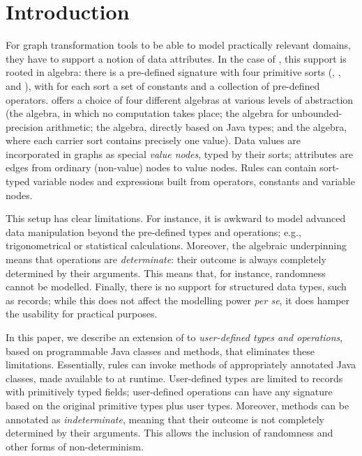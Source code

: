 \section{Introduction}
\label{sec:intro}

For graph transformation tools to be able to model practically relevant domains, they have to support a notion of data attributes. In the case of \GROOVE, this support is rooted in algebra: there is a pre-defined signature with four primitive sorts (\intS, \realS, \boolS and \stringS), with for each sort a set of constants and a collection of pre-defined operators. \GROOVE offers a choice of four different algebras at various levels of abstraction (the \termA algebra, in which no computation takes place; the \bigA algebra for unbounded-precision arithmetic; the \javaA algebra, directly based on Java types; and the \pointA algebra, where each carrier sort contains precisely one value).
%
Data values are incorporated in graphs as special \emph{value nodes}, typed by their sorts; attributes are edges from ordinary (non-value) nodes to value nodes. Rules can contain sort-typed variable nodes and expressions built from operators, constants and variable nodes.

This setup has clear limitations. For instance, it is awkward to model advanced data manipulation beyond the pre-defined types and operations; e.g., trigonometrical or statistical calculations. Moreover, the algebraic underpinning means that operations are \emph{determinate}: their outcome is always completely determined by their arguments. This means that, for instance, randomness cannot be modelled. Finally, there is no support for structured data types, such as records; while this does not affect the modelling power \emph{per se}, it does hamper the usability for practical purposes.

\medskip\noindent
In this paper, we describe an extension of \GROOVE to \emph{user-defined types and operations}, based on programmable Java classes and methods, that eliminates these limitations. Essentially, rules can invoke methods of appropriately annotated Java classes, made available to \GROOVE at runtime. User-defined types are limited to records with primitively typed fields; user-defined operations can have any signature based on the original primitive types plus user types. Moreover, methods can be annotated as \emph{indeterminate}, meaning that their outcome is not completely determined by their arguments. This allows the inclusion of randomness and other forms of non-determinism.


